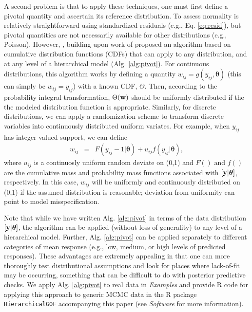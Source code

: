 \documentclass[12pt,english]{article}
\begin{document}
\begin{spacing}{1.9}
A second problem is that to apply these techniques, one must first define a pivotal quantity and ascertain its reference distribution. To assess normality is relatively straightforward using standardized residuals (e.g., Eq. \ref{eq:resid}), but pivotal quantities are not necessarily available for other distributions (e.g., Poisson).  However, \citet{YuanJohnson2012}, building upon work of \citet{Johnson2004} proposed an algorithm based on cumulative distribution functions (CDFs) that can apply to any distribution, and at any level of a hierarchical model (Alg. \ref{alg:pivot}).  For continuous distributions, this algorithm works by defining a quantity $w_{ij} = g(y_{ij},\boldsymbol{\theta})$ (this can simply be $w_{ij}=y_{ij}$) with a known CDF, $\Theta$.  Then, according to the probability integral transformation, $\Theta({\bf w})$ should be uniformly distributed if the the modeled distribution function is appropriate.  Similarly, for discrete distributions, we can apply a randomization scheme \citep{Smith1985,YuanJohnson2012} to transform discrete variables into continuously distributed uniform variates.  For example, when $y_{ij}$ has integer valued support, we can define
\begin{eqnarray*}
  w_{ij} & = & F(y_{ij}-1|\boldsymbol{\theta}) + u_{ij} f(y_{ij}|\boldsymbol{\theta}),
\end{eqnarray*}
where $u_{ij}$ is a continuosly uniform random deviate on (0,1) and $F()$ and $f()$ are the cumulative mass and probability mass functions associated with $[{\bf y} | \boldsymbol{\theta}]$, respectively.  In this case, $w_{ij}$ will be uniformly and continuously distributed on (0,1) if the assumed distribution is reasonable; deviation from uniformity can point to model misspecification.

Note that while we have written Alg. \ref{alg:pivot} in terms of the data distribution $[{\bf y} | \boldsymbol{\theta}]$, the algorithm can be applied (without loss of generality) to any level of a hierarchical model. Further, Alg. \ref{alg:pivot} can be applied separately to different categories of mean response (e.g., low, medium, or high levels of predicted responses). These advantages are extremely appealing in that one can more thoroughly test distributional assumptions and look for places where lack-of-fit may be occurring, something that can be difficult to do with posterior predictive checks.  We apply Alg. \ref{alg:pivot} to real data in \textit{Examples} and provide R code for applying this approach to generic MCMC data in the R package \texttt{HierarchicalGOF} accompanying this paper (see \textit{Software} for more information).


\end{spacing}
\end{document}
